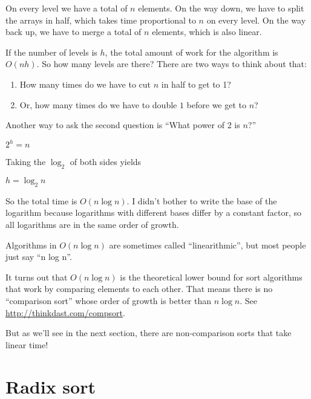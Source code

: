 \documentclass[12pt]{book}
\theoremstyle{exercise}
\begin{document}
On every level we have a total of $n$ elements. On the way down,
we have to split the arrays in half, which takes time proportional to
$n$ on every level. On the way back up, we have to merge a total
of $n$ elements, which is also linear.

If the number of levels is $h$, the total amount of work for the
algorithm is $O(nh)$. So how many levels are there? There are two
ways to think about that:

\begin{enumerate}

\item
  How many times do we have to cut $n$ in half to get to 1?

\item
   Or, how many times do we have to double $1$ before we get to $n$?

\end{enumerate}

Another way to ask the second question is ``What power of 2 is
$n$?''

$2^h = n$

Taking the $\log_2$ of both sides yields

$h = \log_2 n$

So the total time is $O(n \log n)$. I didn't bother to write the
base of the logarithm because logarithms with different bases differ by
a constant factor, so all logarithms are in the same order of growth.


Algorithms in $O(n \log n)$ are sometimes called
``linearithmic'', but most people just say ``n log n''.


It turns out that $O(n \log n)$ is the theoretical lower bound for
sort algorithms that work by comparing elements to each other. That
means there is no ``comparison sort'' whose order of growth is better
than $n \log n$.  See \url{http://thinkdast.com/compsort}.

But as we'll see in the next section, there are non-comparison sorts
that take linear time!



\section{Radix sort}
\label{radix-sort}

\end{document}
